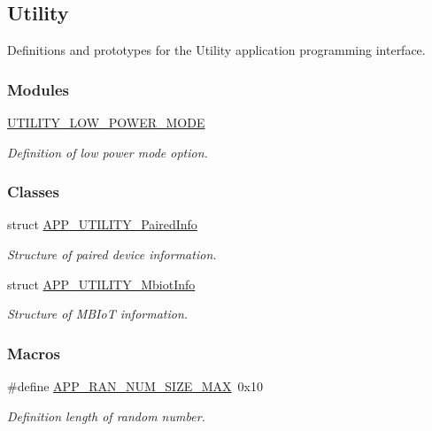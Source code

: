 \hypertarget{group___u_t_i_l_i_t_y}{}\subsection{Utility}
\label{group___u_t_i_l_i_t_y}


Definitions and prototypes for the Utility application programming interface.  


\subsubsection*{Modules}
\begin{DoxyCompactItemize}
\item 
\hyperlink{group___u_t_i_l_i_t_y___l_o_w___p_o_w_e_r___m_o_d_e}{U\+T\+I\+L\+I\+T\+Y\+\_\+\+L\+O\+W\+\_\+\+P\+O\+W\+E\+R\+\_\+\+M\+O\+DE}
\begin{DoxyCompactList}\small\item\em Definition of low power mode option. \end{DoxyCompactList}\end{DoxyCompactItemize}
\subsubsection*{Classes}
\begin{DoxyCompactItemize}
\item 
struct \hyperlink{struct_a_p_p___u_t_i_l_i_t_y___paired_info}{A\+P\+P\+\_\+\+U\+T\+I\+L\+I\+T\+Y\+\_\+\+Paired\+Info}
\begin{DoxyCompactList}\small\item\em Structure of paired device information. \end{DoxyCompactList}\item 
struct \hyperlink{struct_a_p_p___u_t_i_l_i_t_y___mbiot_info}{A\+P\+P\+\_\+\+U\+T\+I\+L\+I\+T\+Y\+\_\+\+Mbiot\+Info}
\begin{DoxyCompactList}\small\item\em Structure of M\+B\+IoT information. \end{DoxyCompactList}\end{DoxyCompactItemize}
\subsubsection*{Macros}
\begin{DoxyCompactItemize}
\item 
\#define \hyperlink{group___u_t_i_l_i_t_y_gab75c2ebff376235ff1f30e4cff413607}{A\+P\+P\+\_\+\+R\+A\+N\+\_\+\+N\+U\+M\+\_\+\+S\+I\+Z\+E\+\_\+\+M\+AX}~0x10\hypertarget{group___u_t_i_l_i_t_y_gab75c2ebff376235ff1f30e4cff413607}{}\label{group___u_t_i_l_i_t_y_gab75c2ebff376235ff1f30e4cff413607}

\begin{DoxyCompactList}\small\item\em Definition length of random number. \end{DoxyCompactList}\end{DoxyCompactItemize}
